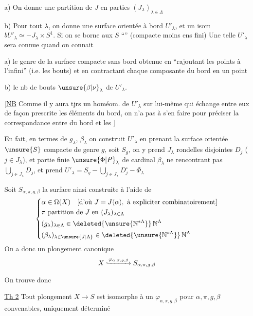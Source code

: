 
a) On donne une partition \inserted{$\pi$} de $J$ en parties $(J_\lambda)_{\lambda\in\Lambda}$

b) Pour tout $\lambda$, on donne une  surface orientée  à bord $U'_\lambda$, et un isom $bU'_\lambda\simeq-J_\lambda\times S^1$. Si on se borne aux $S$ ``'' (compacte moins ens fini) Une telle $U'_\lambda$ sera connue quand on connait

a) le genre  de la surface compacte sans bord obtenue en ``rajoutant les points à l'infini'' (i.e. les bouts) et en contractant chaque composante du bord en un point

b) le nb de bouts $\unsure{\beta|\nu}_\lambda$ de $U'_\lambda$.

[\uline{NB} Comme il y aura tjrs un homéom.  de $U'_\lambda$ sur lui-même  qui échange entre eux de façon prescrite les éléments du bord, on n'a pas à s'en faire pour préciser la  correspondance entre   du bord et les   ]

En fait, en termes de $g_\lambda$, $\beta_\lambda$ on construit $U'_\lambda$ en prenant la surface  orientée $\unsure{S}$ compacte de genre $g$, soit $S_g$, on y prend $J_\lambda$ rondelles disjointes $D_j$ ($j\in J_\lambda$), et  partie  finie $\unsure{\Phi|P}_\lambda$ de cardinal $\beta_\lambda$ ne rencontrant pas $\bigcup_{j\in J_\lambda}D_j$, et prend $U'_\lambda=S_g-\bigcup_{j\in J_\lambda}D_j^\circ-\Phi_\lambda$

Soit $S_{\alpha,\pi,g,\beta}$ la surface ainsi construite à l'aide de
\[
 \left\{\begin{aligned}
 &\alpha\in\Omega(X)\quad[\text{d'où }J=J(\alpha),\text{ à expliciter combinatoirement}]\\
 &\pi\text{ partition de }J\text{ en }(J_\lambda)_{\lambda\in\Lambda}\\
 &(g_\lambda)_{\lambda\in\Lambda}\in\deleted{\unsure{\mathbb N^{*\Lambda}}}\,\mathbb N^\Lambda\\
 &(\beta_\lambda)_{\lambda\in\unsure{J|\Lambda}}\in\deleted{\unsure{\mathbb N^{*\Lambda}}}\,\mathbb N^\Lambda
 \end{aligned}\right.
\]
On a donc un plongement canonique
\[
 X\lhook\joinrel\xrightarrow{\varphi_{\alpha,\pi,g,\beta}} S_{\alpha,\pi,g,\beta}
\]

On trouve donc

\uline{Th 2} Tout plongement $X\longrightarrow S$  est isomorphe à un $\varphi_{\alpha,\pi,g,\beta}$ pour $\alpha,\pi,g,\beta$ convenables, uniquement déterminé
